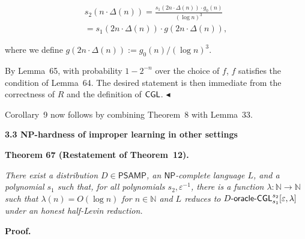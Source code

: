 \[\begin{gathered}
\displaystyle s_{2}(n\cdot\Delta(n)) \displaystyle=\frac{s_{1}(2n\cdot\Delta(n))\cdot g_{0}(n)}{(\log n)^{3}} \\
\displaystyle=s_{1}(2n\cdot\Delta(n))\cdot g(2n\cdot\Delta(n)),
\end{gathered}\]


where we define $g(2n\cdot\Delta(n)):=g_{0}(n)/(\log n)^{3}$.\par




By Lemma 65, with probability $1-2^{-n}$ over the choice of $f$, $f$ satisfies the condition of Lemma 64. The desired statement is then immediate from the correctness of $R$ and the definition of ${\sf CGL}$.
$\blacktriangleleft$\par




Corollary 9 now follows by combining Theorem 8 with Lemma 33.\par






\par\medskip\noindent\textbf{
3.3 NP-hardness of improper learning in other settings}\par





\par\medskip\noindent\textbf{
\textbf{Theorem 67}\textbf{ }(Restatement of Theorem 12)\textbf{.}
}\par



\emph{There exist a distribution $D\in{\mathsf{P}}{\mathsf{SAMP}}$, an ${\mathsf{NP}}$-complete language $L$, and a polynomial $s_{1}$ such that, for all polynomials $s_{2},\varepsilon^{-1}$, there is a function $\lambda:\mathbb{N}\to\mathbb{N}$ such that $\lambda(n)=O(\log n)$ for $n\in\mathbb{N}$ and $L$ reduces to $D\text{-}{\sf oracle}\text{-}{\sf CGL}^{s_{2}}_{s_{1}}[\varepsilon,\lambda]$ under an honest half-Levin reduction.}\par






\par\medskip\noindent\textbf{Proof.}\par





